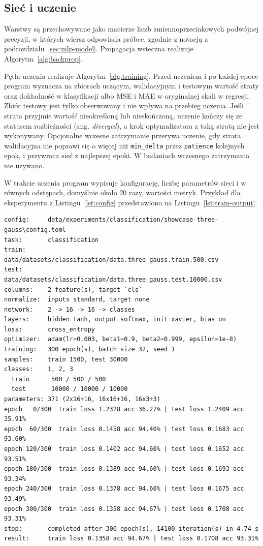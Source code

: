 \subsection{Sieć i uczenie}
\label{sec:implementation-network}

Warstwy są przechowywane jako macierze liczb zmiennoprzecinkowych podwójnej precyzji, w których wiersz odpowiada próbce, zgodnie z notacją z podrozdziału~\ref{sec:mlp-model}. Propagacja wsteczna realizuje Algorytm~\ref{alg:backprop}.

Pętla uczenia realizuje Algorytm~\ref{alg:training}. Przed uczeniem i po każdej epoce program wyznacza na zbiorach uczącym, walidacyjnym i testowym wartość straty oraz dokładność w klasyfikacji albo MSE i MAE w oryginalnej skali w regresji. Zbiór testowy jest tylko obserwowany i nie wpływa na przebieg uczenia. Jeśli strata przyjmie wartość nieokreśloną lub nieskończoną, uczenie kończy się ze statusem rozbieżności (ang. \textit{diverged}), a krok optymalizatora z taką stratą nie jest wykonywany. Opcjonalne wczesne zatrzymanie przerywa uczenie, gdy strata walidacyjna nie poprawi się o więcej niż \texttt{min\_delta} przez \texttt{patience} kolejnych epok, i przywraca sieć z najlepszej epoki. W badaniach wczesnego zatrzymania nie używano.

W trakcie uczenia program wypisuje konfigurację, liczbę parametrów sieci i w równych odstępach, domyślnie około 20 razy, wartości metryk. Przykład dla eksperymentu z Listingu~\ref{lst:config} przedstawiono na Listingu~\ref{lst:train-output}.

\begin{code}
\begin{Verbatim}[fontsize=\small]
config:     data/experiments/classification/showcase-three-gauss\config.toml
task:       classification
train:      data/datasets/classification/data.three_gauss.train.500.csv
test:       data/datasets/classification/data.three_gauss.test.10000.csv
columns:    2 feature(s), target `cls`
normalize:  inputs standard, target none
network:    2 -> 16 -> 16 -> classes
layers:     hidden tanh, output softmax, init xavier, bias on
loss:       cross_entropy
optimizer:  adam(lr=0.003, beta1=0.9, beta2=0.999, epsilon=1e-8)
training:   300 epoch(s), batch size 32, seed 1
samples:    train 1500, test 30000
classes:    1, 2, 3
  train      500 / 500 / 500
  test       10000 / 10000 / 10000
parameters: 371 (2x16+16, 16x16+16, 16x3+3)
epoch   0/300  train loss 1.2328 acc 36.27% | test loss 1.2409 acc 35.91%
epoch  60/300  train loss 0.1458 acc 94.40% | test loss 0.1683 acc 93.60%
epoch 120/300  train loss 0.1402 acc 94.60% | test loss 0.1652 acc 93.51%
epoch 180/300  train loss 0.1389 acc 94.60% | test loss 0.1693 acc 93.34%
epoch 240/300  train loss 0.1378 acc 94.60% | test loss 0.1675 acc 93.49%
epoch 300/300  train loss 0.1358 acc 94.67% | test loss 0.1708 acc 93.31%
stop:       completed after 300 epoch(s), 14100 iteration(s) in 4.74 s
result:     train loss 0.1358 acc 94.67% | test loss 0.1708 acc 93.31%
\end{Verbatim}
    \caption{Wyjście polecenia \texttt{compute train} dla eksperymentu \texttt{showcase-three-gauss} z wypisywaniem metryk co 60 epok.}
    \label{lst:train-output}
\end{code}

